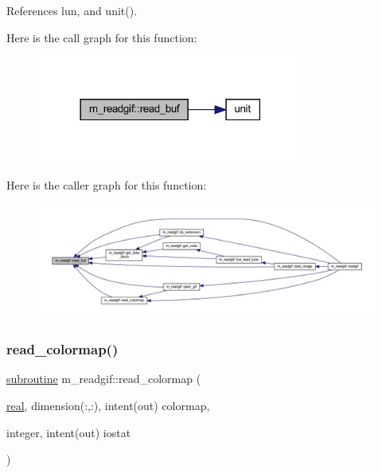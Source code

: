 References lun, and unit().

Here is the call graph for this function\+:
\nopagebreak
\begin{figure}[H]
\begin{center}
\leavevmode
\includegraphics[width=249pt]{namespacem__readgif_a272a4dbcc1419d3d103db4c50b757805_cgraph}
\end{center}
\end{figure}
Here is the caller graph for this function\+:
\nopagebreak
\begin{figure}[H]
\begin{center}
\leavevmode
\includegraphics[width=350pt]{namespacem__readgif_a272a4dbcc1419d3d103db4c50b757805_icgraph}
\end{center}
\end{figure}
\mbox{\label{namespacem__readgif_aabaf13dcb1e665b2524049e5661ca4b6}} 
\subsubsection{\texorpdfstring{read\+\_\+colormap()}{read\_colormap()}}
{\footnotesize\ttfamily \hyperlink{M__stopwatch_83_8txt_acfbcff50169d691ff02d4a123ed70482}{subroutine} m\+\_\+readgif\+::read\+\_\+colormap (\begin{DoxyParamCaption}\item[{\hyperlink{read__watch_83_8txt_abdb62bde002f38ef75f810d3a905a823}{real}, dimension(\+:,\+:), intent(out)}]{colormap,  }\item[{integer, intent(out)}]{iostat }\end{DoxyParamCaption})\hspace{0.3cm}{\ttfamily [private]}}



